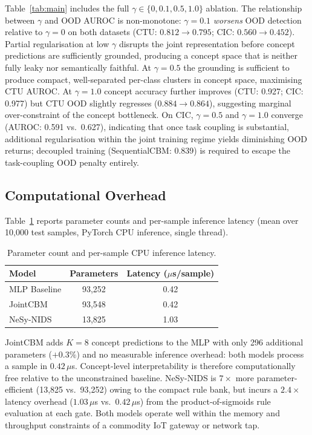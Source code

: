 \documentclass[journal]{IEEEtran}
\begin{document}
Table~\ref{tab:main} includes the full $\gamma \in \{0, 0.1, 0.5, 1.0\}$
ablation. The relationship between $\gamma$ and OOD AUROC is
non-monotone: $\gamma{=}0.1$ \emph{worsens} OOD detection relative to
$\gamma{=}0$ on both datasets (CTU: $0.812\to0.795$; CIC:
$0.560\to0.452$). Partial regularisation at low $\gamma$ disrupts the
joint representation before concept predictions are sufficiently
grounded, producing a concept space that is neither fully leaky nor
semantically faithful. At $\gamma{=}0.5$ the grounding is sufficient to
produce compact, well-separated per-class clusters in concept space,
maximising CTU AUROC. At $\gamma{=}1.0$ concept accuracy further
improves (CTU: 0.927; CIC: 0.977) but CTU OOD slightly regresses
($0.884\to0.864$), suggesting marginal over-constraint of the concept
bottleneck. On CIC, $\gamma{=}0.5$ and $\gamma{=}1.0$ converge
(AUROC: 0.591 vs.\ 0.627), indicating that once task coupling is
substantial, additional regularisation within the joint training
regime yields diminishing OOD returns; decoupled training
(SequentialCBM: 0.839) is required to escape the task-coupling OOD
penalty entirely.

\subsection{Computational Overhead}
\label{sec:compute}

Table~\ref{tab:compute} reports parameter counts and per-sample
inference latency (mean over 10{,}000 test samples, PyTorch CPU
inference, single thread).

\begin{table}[!h]
\renewcommand{\arraystretch}{1.1}
\caption{Parameter count and per-sample CPU inference latency.}
\label{tab:compute}
\centering
\small
\begin{tabular}{lcc}
\toprule
\textbf{Model} & \textbf{Parameters} & \textbf{Latency ($\mu$s/sample)} \\
\midrule
MLP Baseline & 93{,}252 & 0.42 \\
JointCBM     & 93{,}548 & 0.42 \\
NeSy-NIDS    & 13{,}825 & 1.03 \\
\bottomrule
\end{tabular}
\end{table}

JointCBM adds $K{=}8$ concept predictions to the MLP with only 296
additional parameters ($+0.3\%$) and no measurable inference overhead:
both models process a sample in $0.42\,\mu$s. Concept-level
interpretability is therefore computationally free relative to the
unconstrained baseline. NeSy-NIDS is $7{\times}$ more
parameter-efficient (13{,}825 vs.\ 93{,}252) owing to the compact rule
bank, but incurs a $2.4{\times}$ latency overhead ($1.03\,\mu$s
vs.\ $0.42\,\mu$s) from the product-of-sigmoids rule evaluation at each
gate. Both models operate well within the memory and throughput
constraints of a commodity IoT gateway or network tap.
\end{document}
